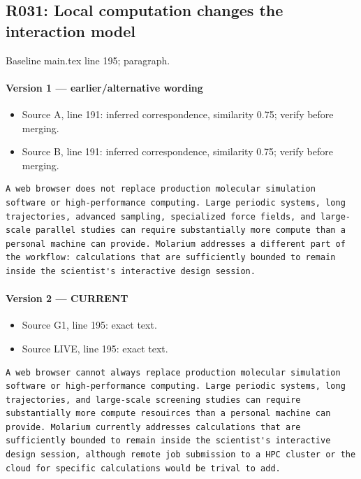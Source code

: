 \documentclass[11pt]{article}
\begin{document}
\subsection{R031: Local computation changes the interaction model}

Baseline main.tex line 195; paragraph.

\paragraph{Version 1 --- earlier/alternative wording}

\begin{itemize}[leftmargin=*]
\item Source A, line 191: inferred correspondence, similarity 0.75; verify before merging.
\item Source B, line 191: inferred correspondence, similarity 0.75; verify before merging.
\end{itemize}

\begin{lstlisting}
A web browser does not replace production molecular simulation software or high-performance computing. Large periodic systems, long trajectories, advanced sampling, specialized force fields, and large-scale parallel studies can require substantially more compute than a personal machine can provide. Molarium addresses a different part of the workflow: calculations that are sufficiently bounded to remain inside the scientist's interactive design session.
\end{lstlisting}

\paragraph{Version 2 --- CURRENT}

\begin{itemize}[leftmargin=*]
\item Source G1, line 195: exact text.
\item Source LIVE, line 195: exact text.
\end{itemize}

\begin{lstlisting}
A web browser cannot always replace production molecular simulation software or high-performance computing. Large periodic systems, long trajectories, and large-scale screening studies can require substantially more compute resouirces than a personal machine can provide. Molarium currently addresses calculations that are sufficiently bounded to remain inside the scientist's interactive design session, although remote job submission to a HPC cluster or the cloud for specific calculations would be trival to add.
\end{lstlisting}
\end{document}
